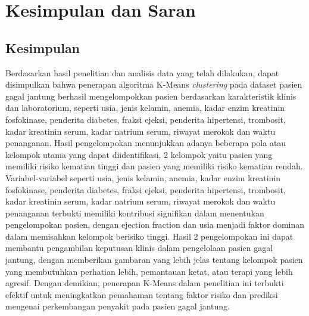 \documentclass[english,12pt,a4paper,openany]{book}
\begin{document}
	
	\chapter{Kesimpulan dan Saran}
	\section{Kesimpulan}
	Berdasarkan hasil penelitian dan analisis data yang telah dilakukan, dapat disimpulkan bahwa penerapan algoritma K-Means \textit{clustering} pada dataset pasien gagal jantung berhasil mengelompokkan pasien berdasarkan karakteristik klinis dan laboratorium, seperti usia, jenis kelamin, anemia, kadar enzim kreatinin fosfokinase, penderita diabetes, fraksi ejeksi, penderita hipertensi, trombosit, kadar kreatinin serum, kadar natrium serum, riwayat merokok dan waktu penanganan. Hasil pengelompokan menunjukkan adanya beberapa pola atau kelompok utama yang dapat diidentifikasi, 2 kelompok yaitu pasien yang memiliki risiko kematian tinggi dan pasien yang memiliki risiko kematian rendah. Variabel-variabel seperti usia, jenis kelamin, anemia, kadar enzim kreatinin fosfokinase, penderita diabetes, fraksi ejeksi, penderita hipertensi, trombosit, kadar kreatinin serum, kadar natrium serum, riwayat merokok dan waktu penanganan terbukti memiliki kontribusi signifikan dalam menentukan pengelompokan pasien, dengan {ejection fraction} dan {usia} menjadi faktor dominan dalam memisahkan kelompok berisiko tinggi. Hasil 2 pengelompokan ini dapat membantu pengambilan keputusan klinis dalam pengelolaan pasien gagal jantung, dengan memberikan gambaran yang lebih jelas tentang kelompok pasien yang membutuhkan perhatian lebih, pemantauan ketat, atau terapi yang lebih agresif. Dengan demikian, penerapan K-Means dalam penelitian ini terbukti efektif untuk meningkatkan pemahaman tentang faktor risiko dan prediksi mengenai perkembangan penyakit pada pasien gagal jantung.
	
\end{document}
